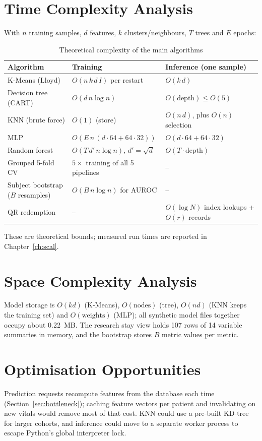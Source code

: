 \section{Time Complexity Analysis}
With $n$ training samples, $d$ features, $k$ clusters/neighbours, $T$ trees and $E$ epochs:

\begin{table}[!htbp]
\centering
\caption{Theoretical complexity of the main algorithms}
\label{tab:complexity}
\small
\begin{tabularx}{\textwidth}{@{}lYY@{}}
\toprule
Algorithm & Training & Inference (one sample)\\
\midrule
K-Means (Lloyd) & $O(n\,k\,d\,I)$ per restart & $O(k\,d)$\\
Decision tree (CART) & $O(d\,n\log n)$ & $O(\text{depth})\le O(5)$\\
KNN (brute force) & $O(1)$ (store) & $O(n\,d)$, plus $O(n)$ selection\\
MLP & $O(E\,n\,(d\cdot 64+64\cdot 32))$ & $O(d\cdot 64+64\cdot 32)$\\
Random forest & $O(T\,d'\,n\log n)$, $d'=\sqrt d$ & $O(T\cdot\text{depth})$\\
Grouped 5-fold CV & $5\times$ training of all 5 pipelines & --\\
Subject bootstrap ($B$ resamples) & $O(B\,n\log n)$ for AUROC & --\\
QR redemption & -- & $O(\log N)$ index lookups + $O(r)$ records\\
\bottomrule
\end{tabularx}
\end{table}

These are theoretical bounds; measured run times are reported in Chapter~\ref{ch:scal}.

\section{Space Complexity Analysis}
Model storage is $O(kd)$ (K-Means), $O(\text{nodes})$ (tree), $O(nd)$ (KNN keeps the training set) and
$O(\text{weights})$ (MLP); all synthetic model files together occupy about 0.22~MB. The research stay
view holds 107 rows of 14 variable summaries in memory, and the bootstrap stores $B$ metric values per
metric.

\section{Optimisation Opportunities}
Prediction requests recompute features from the database each time (Section~\ref{sec:bottleneck}); caching
feature vectors per patient and invalidating on new vitals would remove most of that cost. KNN could use a
pre-built KD-tree for larger cohorts, and inference could move to a separate worker process to escape
Python's global interpreter lock.

